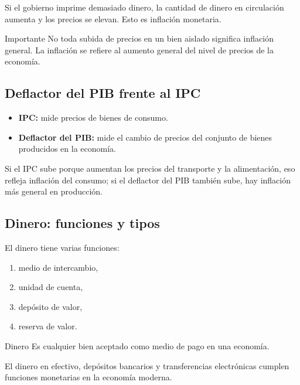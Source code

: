 \begin{ejemplo}
Si el gobierno imprime demasiado dinero, la cantidad de dinero en circulación aumenta y los precios se elevan. Esto es inflación monetaria.
\end{ejemplo}

\begin{advertencia}{Importante}
No toda subida de precios en un bien aislado significa inflación general. La inflación se refiere al aumento general del nivel de precios de la economía.
\end{advertencia}

\subsection{Deflactor del PIB frente al IPC}

\begin{itemize}
    \item \textbf{IPC:} mide precios de bienes de consumo.
    \item \textbf{Deflactor del PIB:} mide el cambio de precios del conjunto de bienes producidos en la economía.
\end{itemize}

\begin{ejemplo}
Si el IPC sube porque aumentan los precios del transporte y la alimentación, eso refleja inflación del consumo; si el deflactor del PIB también sube, hay inflación más general en producción.
\end{ejemplo}

\subsection{Dinero: funciones y tipos}

El dinero tiene varias funciones:
\begin{enumerate}
    \item medio de intercambio,
    \item unidad de cuenta,
    \item depósito de valor,
    \item reserva de valor.
\end{enumerate}

\begin{concepto}{Dinero}
Es cualquier bien aceptado como medio de pago en una economía.
\end{concepto}

\begin{ejemplo}
El dinero en efectivo, depósitos bancarios y transferencias electrónicas cumplen funciones monetarias en la economía moderna.
\end{ejemplo}


